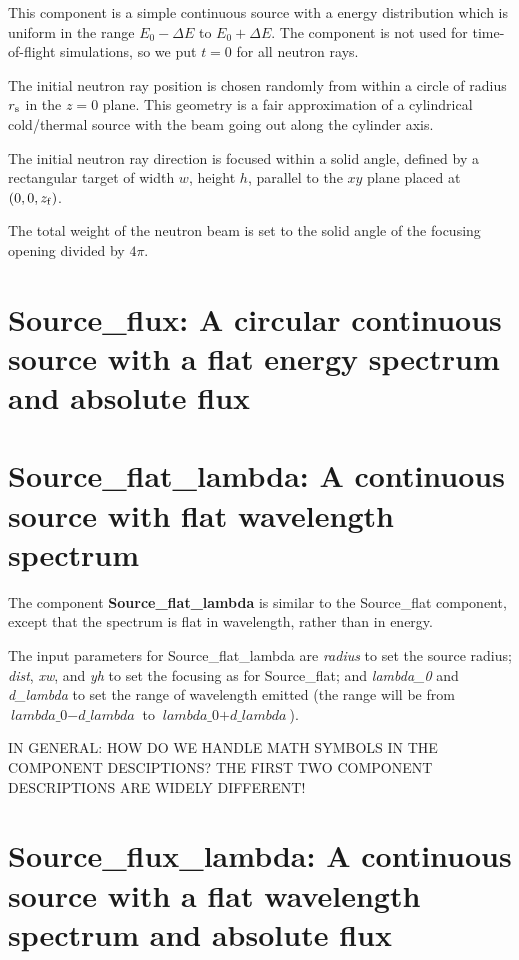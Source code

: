This component is 
a simple continuous source with a energy distribution which is uniform
in the range $E_0 - \Delta E$ to $E_0 + \Delta E$.
The component is not used for time-of-flight simulations,
so we put $t=0$ for all neutron rays.

The initial neutron ray position is chosen randomly from within a
circle of radius $r_{\rm s}$ in the $z=0$ plane. 
This geometry is a fair approximation
of a cylindrical cold/thermal source with the beam going out along
the cylinder axis.

The initial neutron ray direction is focused within
a solid angle, defined by a rectangular target of width
$w$, height $h$, parallel to 
the $xy$ plane placed at $(0,0,z_{\rm f})$. 

The total weight of the neutron beam is set to the
solid angle of the focusing opening divided by $4\pi$.

\section{Source\_flux: A circular continuous source with a flat energy spectrum and absolute flux}
\label{source-flux}

\section{Source\_flat\_lambda: A continuous source with flat
  wavelength spectrum}
\label{source-flat-lambda}


The component {\bf Source\_flat\_lambda} is similar to the Source\_flat
component, except that the spectrum is flat in wavelength, rather
than in energy.

The input parameters for Source\_flat\_lambda are \textit{radius} to set
the source radius; \textit{dist}, \textit{xw}, and \textit{yh}
to set the focusing as for Source\_flat; and \textit{lambda\_0} and
\textit{d\_lambda} to set the range of wavelength emitted (the range
will be from $\textit{lambda\_0} - \textit{d\_lambda}$ to
$\textit{lambda\_0} + \textit{d\_lambda}$).

IN GENERAL: HOW DO WE HANDLE MATH SYMBOLS IN THE COMPONENT DESCIPTIONS? THE 
FIRST TWO COMPONENT DESCRIPTIONS ARE WIDELY DIFFERENT!

\section{Source\_flux\_lambda: A continuous source with a flat wavelength spectrum and absolute flux}
\label{Source_flux_lambda}

